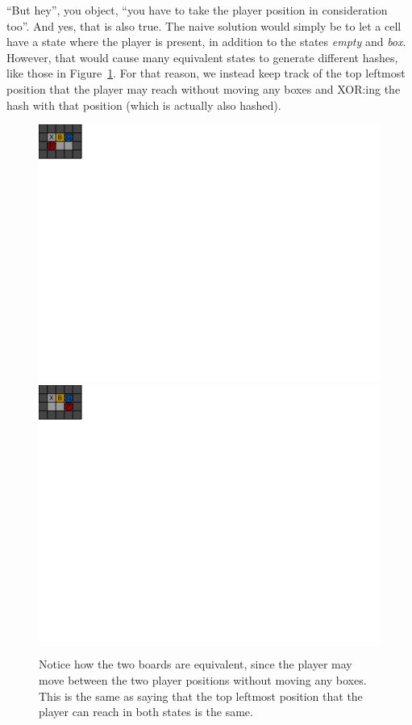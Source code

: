 \documentclass[a4paper,11pt]{article}
\renewcommand{\*}[0]{\cdot}
\begin{document}
``But hey'', you object, ``you have to take the player position in
consideration too''. And yes, that is also true. The naive solution would
simply be to let a cell have a state where the player is present, in addition
to the states \emph{empty} and \emph{box}. However, that would cause many
equivalent states to generate different hashes, like those in
Figure~\ref{fig:equalStatesDifferentHash}. For that reason, we instead keep
track of the top leftmost position that the player may reach without moving any
boxes and XOR:ing the hash with that position (which is actually also hashed).

\begin{figure}[h!]
    \begin{center}
        \includegraphics{figures/equalState1}
        \includegraphics{figures/equalState2}
    \end{center}
    \caption{Notice how the two boards are equivalent, since the player may move
    between the two player positions without moving any boxes. This is the same
    as saying that the top leftmost position that the player can reach in both
    states is the same.}
    \label{fig:equalStatesDifferentHash}
\end{figure}
\end{document}
